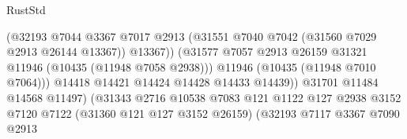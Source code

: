 \begin{lexlean}{RustStd}
\begin{coremodule}
                                                    (@32193
                                                      @7044
                                                      @3367
                                                      @7017
                                                      @2913
                                                      (@31551
                                                        @7040
                                                        @7042
                                                        (@31560 @7029 @2913 @26144 @13367))
                                                      @13367))
                                                  (@31577
                                                    @7057
                                                    @2913
                                                    @26159
                                                    @31321
                                                    @11946
                                                    (@10435 (@11948 @7058 @2938)))
                                                  @11946
                                                  (@10435 (@11948 @7010 @7064)))
                                                @14418
                                                @14421
                                                @14424
                                                @14428
                                                @14433
                                                @14439))
                                            @31701
                                            @11484
                                            @14568
                                            @11497)
                                          (@31343
                                            @2716
                                            @10538
                                            @7083
                                            @121
                                            @1122
                                            @127
                                            @2938
                                            @3152
                                            @7120
                                            @7122
                                            (@31360 @121 @127 @3152 @26159)
                                            (@32193
                                              @7117
                                              @3367
                                              @7090
                                              @2913

\end{coremodule}
\end{lexlean}
